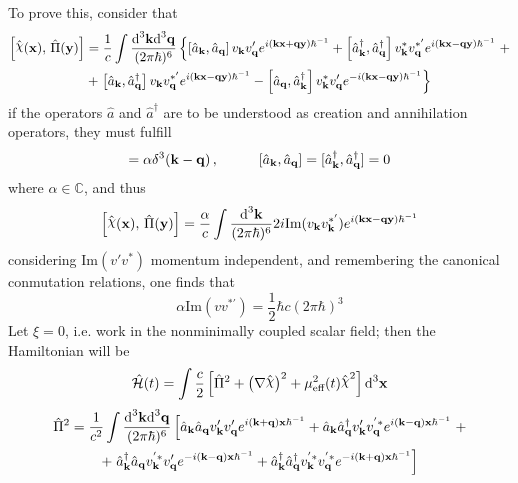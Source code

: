 To prove this, consider that
\begin{multline}
	\left[\hat{\rchi}(\mathbf{x}),\,\hat{\Pi}(\mathbf{y})\right]=\frac{1}{c}\int\frac{\td^3\mathbf{k}\td^3\mathbf{q}}{(2\pi\hbar)^6}\left\{\left[\hat{a}_\mathbf{k},\hat{a}_\mathbf{q}\right]v_\mathbf{k}v'_\mathbf{q}e^{i\left(\mathbf{kx}+\mathbf{qy}\right)\hbar^{-1}}+\left[\hat{a}_\mathbf{k}^\dagger, \hat{a}_\mathbf{q}^\dagger\right]v_\mathbf{k}^*v_\mathbf{q}^{*'}e^{i(\mathbf{kx}-\mathbf{qy})\hbar^{-1}}\right.+\\
	+\left.\left[\hat{a}_\mathbf{k},\hat{a}_\mathbf{q}^\dagger\right] v_\mathbf{k}v^{*'}_\mathbf{q}e^{i(\mathbf{kx}-\mathbf{qy})\hbar^{-1}}-\left[\hat{a}_\mathbf{q},\hat{a}_\mathbf{k}^\dagger\right]v^*_\mathbf{k}v_\mathbf{q}'e^{-i(\mathbf{kx}-\mathbf{qy})\hbar^{-1}}\right\}
\end{multline}
if the operators $\hat{a}$ and $\hat{a}^\dagger$ are to be understood as creation and annihilation operators, they must fulfill
\begin{equation}
	[\hat{a}_\mathbf{k},\hat{a}_\mathbf{q}^\dagger]=\alpha\delta^3(\mathbf{k}-\mathbf{q})\,,\hspace{1.0cm}[\hat{a}_\mathbf{k},\hat{a}_\mathbf{q}]=[\hat{a}_\mathbf{k}^\dagger,\hat{a}_\mathbf{q}^\dagger]=0
\end{equation}
where $\alpha\in\mathbb{C}$, and thus
\begin{equation}
	\left[\hat{\rchi}(\mathbf{x}),\,\hat{\Pi}(\mathbf{y})\right]=\frac{\alpha}{c}\int\frac{\td^3\mathbf{k}}{(2\pi\hbar)^6}2i\text{Im}(v_\mathbf{k}v_\mathbf{k}^{*'})e^{i(\mathbf{kx}-\mathbf{qy})\hbar^{-1}}
\end{equation}
considering Im$(v'v^*)$ momentum independent, and remembering the canonical conmutation relations, one finds that
\begin{equation}
	\alpha\text{Im}(vv^{*'})=\frac{1}{2}\hbar c(2\pi\hbar)^3
\end{equation}
Let $\xi=0$, i.e. work in the nonminimally coupled scalar field; then the Hamiltonian will be
\begin{equation}
	\hat{\mathcal{H}}(t)=\int\frac{c}{2}\left[\hat{\Pi}^2+\left(\mathbf{\nabla}\hat{\rchi}\right)^2+\mu_{\text{eff}}^2(t)\hat{\rchi}^2\right]\td^3\mathbf{x}
\end{equation}
\begin{multline}
	\hat{\Pi}^2=\frac{1}{c^2}\int\frac{\text{d}^3\mathbf{k}\text{d}^3\mathbf{q}}{(2\pi\hbar)^6}\left[\hat{a}_\mathbf{k}\hat{a}_\mathbf{q}v'_\mathbf{k}v'_\mathbf{q}e^{i(\mathbf{k}+\mathbf{q})\mathbf{x}\hbar^{-1}}+\hat{a}_\mathbf{k}\hat{a}_\mathbf{q}^\dagger v'_\mathbf{k}v^{'*}_\mathbf{q}e^{i(\mathbf{k}-\mathbf{q})\mathbf{x}\hbar^{-1}}\right.+\\
	+\left.\hat{a}^\dagger_\mathbf{k}\hat{a}_\mathbf{q}v^{'*}_\mathbf{k}v'_\mathbf{q}e^{-i(\mathbf{k}-\mathbf{q})\mathbf{x}\hbar^{-1}}+\hat{a}_\mathbf{k}^\dagger\hat{a}_\mathbf{q}^\dagger v^{'*}_\mathbf{k}v^{'*}_\mathbf{q}e^{-i(\mathbf{k}+\mathbf{q})\mathbf{x}\hbar^{-1}}\right]
\end{multline}
